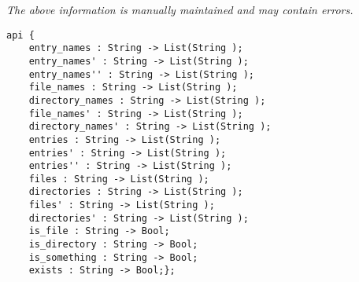 \label{api:Dir}

{\tiny \it The above information is manually maintained and may contain errors.}
\begin{verbatim}
api {
    entry_names : String -> List(String );
    entry_names' : String -> List(String );
    entry_names'' : String -> List(String );
    file_names : String -> List(String );
    directory_names : String -> List(String );
    file_names' : String -> List(String );
    directory_names' : String -> List(String );
    entries : String -> List(String );
    entries' : String -> List(String );
    entries'' : String -> List(String );
    files : String -> List(String );
    directories : String -> List(String );
    files' : String -> List(String );
    directories' : String -> List(String );
    is_file : String -> Bool;
    is_directory : String -> Bool;
    is_something : String -> Bool;
    exists : String -> Bool;};
\end{verbatim}
